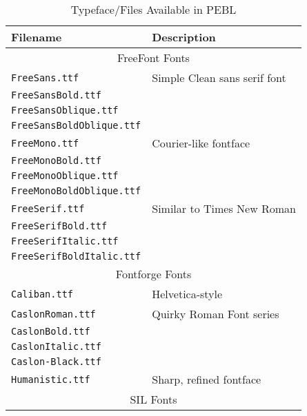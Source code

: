 \begin{table}[htbp]
\caption{Typeface/Files Available in PEBL}
\begin{tabular}{ll}
\toprule
\textbf{Filename}&\textbf{Description}\\
\midrule
\multicolumn{2}{c}{FreeFont Fonts}\\
\texttt{FreeSans.ttf} &Simple Clean sans serif font\\
\texttt{FreeSansBold.ttf}& \\
\texttt{FreeSansOblique.ttf}&\\
\texttt{FreeSansBoldOblique.ttf}&\\
\texttt{FreeMono.ttf}& Courier-like fontface\\
\texttt{FreeMonoBold.ttf}& \\
\texttt{FreeMonoOblique.ttf}& \\
\texttt{FreeMonoBoldOblique.ttf}& \\
\texttt{FreeSerif.ttf}& Similar to Times New Roman\\
\texttt{FreeSerifBold.ttf}& \\
\texttt{FreeSerifItalic.ttf}&\\
\texttt{FreeSerifBoldItalic.ttf}& \\
\midrule
\multicolumn{2}{c}{Fontforge Fonts}\\
\texttt{Caliban.ttf}&  Helvetica-style  \\
\texttt{CaslonRoman.ttf}& Quirky Roman Font series\\
\texttt{CaslonBold.ttf}&\\
\texttt{CaslonItalic.ttf}&\\
\texttt{Caslon-Black.ttf}&\\
\texttt{Humanistic.ttf}&Sharp, refined fontface\\
\midrule
\multicolumn{2}{c}{SIL Fonts}\\


\end{tabular}
\end{table}
